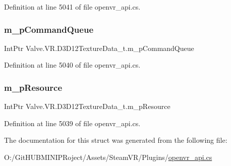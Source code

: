 Definition at line 5041 of file openvr\+\_\+api.\+cs.

\mbox{\label{struct_valve_1_1_v_r_1_1_d3_d12_texture_data__t_aba9327e24246b3d5141975bca891c2a1}} 
\subsubsection{\texorpdfstring{m\_pCommandQueue}{m\_pCommandQueue}}
{\footnotesize\ttfamily Int\+Ptr Valve.\+V\+R.\+D3\+D12\+Texture\+Data\+\_\+t.\+m\+\_\+p\+Command\+Queue}



Definition at line 5040 of file openvr\+\_\+api.\+cs.

\mbox{\label{struct_valve_1_1_v_r_1_1_d3_d12_texture_data__t_a057ca734b24c966aa15bfcf48e3c17b6}} 
\subsubsection{\texorpdfstring{m\_pResource}{m\_pResource}}
{\footnotesize\ttfamily Int\+Ptr Valve.\+V\+R.\+D3\+D12\+Texture\+Data\+\_\+t.\+m\+\_\+p\+Resource}



Definition at line 5039 of file openvr\+\_\+api.\+cs.



The documentation for this struct was generated from the following file\+:\begin{DoxyCompactItemize}
\item 
O\+:/\+Git\+H\+U\+B\+M\+I\+N\+I\+P\+Roject/\+Assets/\+Steam\+V\+R/\+Plugins/\mbox{\hyperlink{openvr__api_8cs}{openvr\+\_\+api.\+cs}}\end{DoxyCompactItemize}
